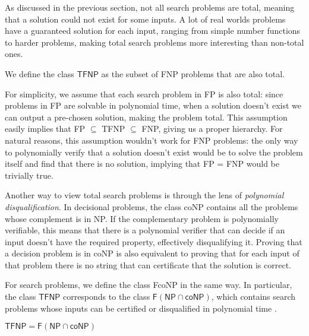 \newpage

As discussed in the previous section, not all search problems are total, meaning that a solution could not exist for some inputs. A lot of real worlds problems have a guaranteed solution for each input, ranging from simple number functions to harder problems, making total search problems more interesting than non-total ones.

\begin{definition}
    We define the class $\mathsf{TFNP}$ as the subset of \textsf{FNP} problems that are also total.
\end{definition}

For simplicity, we assume that each search problem in \textsf{FP} is also total: since problems in \textsf{FP} are solvable in polynomial time, when a solution doesn't exist we can output a pre-chosen  solution, making the problem total. This assumption easily implies that \textsf{FP} $\subseteq$ \textsf{TFNP} $\subseteq$ \textsf{FNP}, giving us a proper hierarchy. For natural reasons, this assumption wouldn't work for \textsf{FNP} problems: the only way to polynomially verify that a solution doesn't exist would be to solve the problem itself and find that there is no solution, implying that \textsf{FP} = \textsf{FNP} would be trivially true.

Another way to view total search problems is through the lens of \textit{polynomial disqualification}. In decisional problems, the class \textsf{coNP} contains all the problems whose complement is in \textsf{NP}. If the complementary problem is polynomially verifiable, this means that there is a polynomial verifier that can decide if an input doesn't have the required property, effectively disqualifying it. Proving that a decision problem is in \textsf{coNP} is also equivalent to proving that for each input of that problem there is no string that can certificate that the solution is correct.

For search problems, we define the class \textsf{FcoNP} in the same way. In particular, the class $\textsf{TFNP}$ corresponds to the class $\mathsf{F}(\mathsf{NP} \cap \mathsf{coNP})$, which contains search problems whose inputs can be certified or disqualified in polynomial time \cite{tfnp_f_np_conp}.

\begin{proposition}
    \label{tfnp_f_np_conp}
    $\mathsf{TFNP} = \mathsf{F}(\mathsf{NP} \cap \mathsf{coNP})$
\end{proposition}

